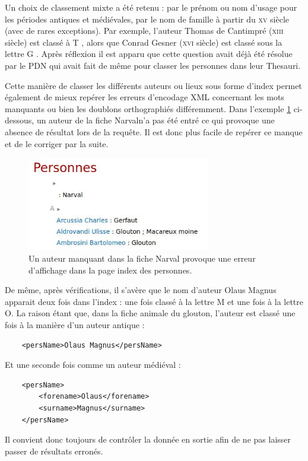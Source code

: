 \documentclass[a4paper,12pt,twoside]{book}
\begin{document}
Un choix de classement mixte a été retenu : par le prénom ou nom d'usage pour les périodes antiques et médiévales, par le nom de famille à partir du \textsc{xv}\ieme{} siècle (avec de rares exceptions). Par exemple, l'auteur Thomas de Cantimpré (\textsc{xiii}\ieme{} siècle) est classé à \og T \fg, alors que Conrad Gesner (\textsc{xvi}\ieme{} siècle) est classé sous la lettre \og G \fg. Après réflexion il est apparu que cette question avait déjà été résolue par le \acrshort{PDN} qui avait fait de même pour classer les personnes dans leur Thesauri.

Cette manière de classer les différents auteurs ou lieux sous forme d'index permet également de mieux repérer les erreurs d'encodage XML concernant les mots manquants ou bien les doublons orthographiés différemment. Dans l'exemple \ref{erreur} ci-dessous, un auteur de la fiche \og Narval\fg n'a pas été entré ce qui provoque une absence de résultat lors de la requête. Il est donc plus facile de repérer ce manque et de le corriger par la suite.

\begin{figure}[H]
    \centering
    \includegraphics[width=8cm]{img/partie_3/erreur_narval.JPG}
    \caption{Un auteur manquant dans la fiche Narval provoque une erreur d'affichage dans la page index des personnes.}
    \label{erreur}
\end{figure}

De même, après vérifications, il s'avère que le nom d'auteur Olaus Magnus apparait deux fois dans l'index : une fois classé à la lettre \og M \fg{} et une fois à la lettre \og O\fg. La raison étant que, dans la fiche animale du glouton, l'auteur est classé une fois à la manière d'un auteur antique : 
\begin{verbatim}
    <persName>Olaus Magnus</persName>
\end{verbatim}
Et une seconde fois comme un auteur médiéval :
\begin{verbatim}
    <persName>
        <forename>Olaus</forename>
        <surname>Magnus</surname>
    </persName>
\end{verbatim}
Il convient donc toujours de contrôler la donnée en sortie afin de ne pas laisser passer de résultats erronés.
\end{document}
